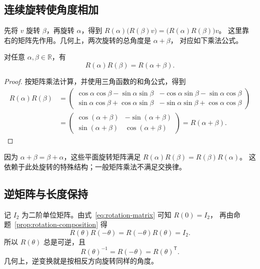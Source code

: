 \documentclass[UTF8,12pt,a4paper,fontset=fandol]{ctexart}
\begin{document}
\subsection{连续旋转使角度相加}

先将 $v$ 旋转 $\beta$，再旋转 $\alpha$，得到
$R(\alpha)\bigl(R(\beta)v\bigr)=\bigl(R(\alpha)R(\beta)\bigr)v$。
这里靠右的矩阵先作用。几何上，两次旋转的总角度是 $\alpha+\beta$，
对应如下乘法公式。

\begin{proposition}[旋转的复合]
\label{prop:rotation-composition}
对任意 $\alpha,\beta\in\mathbb R$，有
\begin{equation}
  R(\alpha)R(\beta)=R(\alpha+\beta).
  \label{eq:rotation-composition}
\end{equation}
\end{proposition}

\begin{proof}
按矩阵乘法计算，并使用三角函数的和角公式，得到
\begin{align*}
  R(\alpha)R(\beta)
  &=\begin{pmatrix}
    \cos\alpha\cos\beta-\sin\alpha\sin\beta&
    -\cos\alpha\sin\beta-\sin\alpha\cos\beta\\
    \sin\alpha\cos\beta+\cos\alpha\sin\beta&
    -\sin\alpha\sin\beta+\cos\alpha\cos\beta
  \end{pmatrix}\\
  &=\begin{pmatrix}
    \cos(\alpha+\beta)&-\sin(\alpha+\beta)\\
    \sin(\alpha+\beta)&\cos(\alpha+\beta)
  \end{pmatrix}=R(\alpha+\beta).
\end{align*}
\end{proof}

因为 $\alpha+\beta=\beta+\alpha$，这些平面旋转矩阵满足
$R(\alpha)R(\beta)=R(\beta)R(\alpha)$。
这依赖于此处旋转的特殊结构；一般矩阵乘法不满足交换律。

\subsection{逆矩阵与长度保持}

记 $I_2$ 为二阶单位矩阵。由式~\eqref{eq:rotation-matrix} 可知 $R(0)=I_2$，
再由命题~\ref{prop:rotation-composition} 得
\[
  R(\theta)R(-\theta)=R(-\theta)R(\theta)=I_2.
\]
所以 $R(\theta)$ 总是可逆，且
\begin{equation}
  R(\theta)^{-1}=R(-\theta)=R(\theta)^{\mathsf T}.
  \label{eq:rotation-inverse}
\end{equation}
几何上，逆变换就是按相反方向旋转同样的角度。
\end{document}
